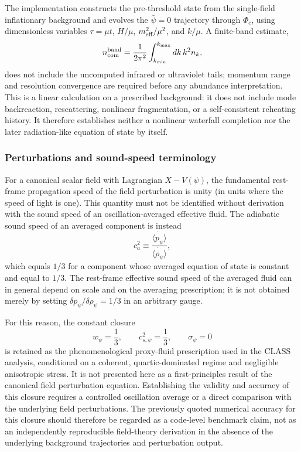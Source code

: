 \documentclass[epj]{svjour}
\begin{document}
The implementation constructs the pre-threshold state from the
single-field inflationary background and evolves the \(\bar\psi=0\)
trajectory through \(\Phi_c\), using dimensionless variables
\(\tau=\mu t\), \(H/\mu\), \(m_{\rm eff}^2/\mu^2\), and \(k/\mu\).
A finite-band estimate,
\begin{equation}
n_{\rm com}^{\rm band}=
\frac{1}{2\pi^2}\int_{k_{\min}}^{k_{\max}}dk\,k^2 n_k,
\label{eq:waterfall_finite_band_number}
\end{equation}
does not include the uncomputed infrared or ultraviolet tails; momentum
range and resolution convergence are required before any abundance
interpretation. This is a linear calculation on a prescribed background:
it does not include mode backreaction, rescattering, nonlinear
fragmentation, or a self-consistent reheating history. It therefore
establishes neither a nonlinear waterfall completion nor the later
radiation-like equation of state by itself.

\subsubsection{Perturbations and sound-speed terminology}

For a canonical scalar field with Lagrangian
$X-V(\psi)$, the fundamental rest-frame propagation speed of the field
perturbation is unity (in units where the speed of light is one). This
quantity must not be identified without derivation with the sound speed of
an oscillation-averaged effective fluid. The adiabatic sound speed of an
averaged component is instead
\begin{equation}
c_a^2\equiv\frac{\dot{\langle p_\psi\rangle}}
{\dot{\langle\rho_\psi\rangle}},
\end{equation}
which equals $1/3$ for a component whose averaged equation of state is
constant and equal to $1/3$. The rest-frame effective sound speed of the
averaged fluid can in general depend on scale and on the averaging
prescription; it is not obtained merely by setting
$\delta p_\psi/\delta\rho_\psi=1/3$ in an arbitrary gauge.

For this reason, the constant closure
\begin{equation}
w_\psi=\frac13,\qquad c_{s,\psi}^2=\frac13,\qquad
\sigma_\psi=0
\label{eq:pfd_phenomenological_closure}
\end{equation}
is retained as the phenomenological proxy-fluid prescription used in the
CLASS analysis, conditional on a coherent, quartic-dominated regime and
negligible anisotropic stress. It is not presented here as a first-principles
result of the canonical field perturbation equation. Establishing the
validity and accuracy of this closure requires a controlled oscillation
average or a direct comparison with the underlying field perturbations.
The previously quoted numerical accuracy for this closure should therefore
be regarded as a code-level benchmark claim, not as an independently
reproducible field-theory derivation in the absence of the underlying
background trajectories and perturbation output.
\end{document}
